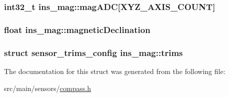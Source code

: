 \hypertarget{structins__mag_a699e13cd3b68a4b44600e09f13809312}{
\subsubsection[{mag\+A\+D\+C}]{\setlength{\rightskip}{0pt plus 5cm}int32\+\_\+t ins\+\_\+mag\+::mag\+A\+D\+C\mbox{[}{\bf X\+Y\+Z\+\_\+\+A\+X\+I\+S\+\_\+\+C\+O\+U\+N\+T}\mbox{]}}}\label{structins__mag_a699e13cd3b68a4b44600e09f13809312}
\hypertarget{structins__mag_a936dac247a06599a356a582ed7c4588b}{
\subsubsection[{magnetic\+Declination}]{\setlength{\rightskip}{0pt plus 5cm}float ins\+\_\+mag\+::magnetic\+Declination}}\label{structins__mag_a936dac247a06599a356a582ed7c4588b}
\hypertarget{structins__mag_a5dbcf3f1de13ebc4ef78664e504320be}{
\subsubsection[{trims}]{\setlength{\rightskip}{0pt plus 5cm}struct {\bf sensor\+\_\+trims\+\_\+config} ins\+\_\+mag\+::trims}}\label{structins__mag_a5dbcf3f1de13ebc4ef78664e504320be}


The documentation for this struct was generated from the following file\+:\begin{DoxyCompactItemize}
\item 
src/main/sensors/\hyperlink{sensors_2compass_8h}{compass.\+h}\end{DoxyCompactItemize}
